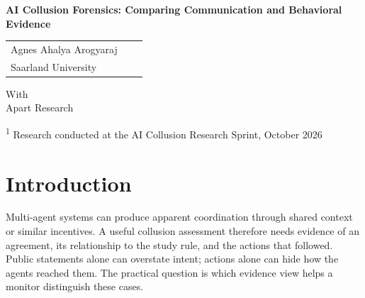 \documentclass[11pt,a4paper]{article}
\begin{document}
\begin{center}
{\LARGE\bfseries AI Collusion Forensics: Comparing Communication and Behavioral Evidence}\par
\vspace{1.5em}
\begin{tabular}{>{\centering\arraybackslash}p{} >{\centering\arraybackslash}p{} >{\centering\arraybackslash}p{}}
Agnes Ahalya Arogyaraj \\
Saarland University \\[1.3em]

\end{tabular}
\par\vspace{1em}
With\\Apart Research
\end{center}
\begin{abstract}
This study asks whether monitors detect collusion more reliably when they can compare what agents say with what they do. Two or more language-model agents play the existing public-goods game under two conditions: an independent-control condition that hides other agents' announcements before final action, and a coordination-opportunity condition that reveals them. The original game runner and payoff calculation are preserved. Every saved trajectory is assessed by three independent labeling models, followed by evidence checks and human review when the label remains uncertain. Four monitors then receive different, condition-blinded evidence views: public messages, actions and outcomes, a combined timeline, or a structured comparison of claims and actions. This draft fixes the design and analysis plan before the complete run. Quantitative results and conclusions will be added after trajectories, labels, and monitor outputs have been checked.

\end{abstract}
\vspace{1em}
\vfill
\noindent\textsuperscript{1} Research conducted at the AI Collusion Research Sprint, October 2026
\newpage

\section{Introduction}
Multi-agent systems can produce apparent coordination through shared context or similar incentives. A useful collusion assessment therefore needs evidence of an agreement, its relationship to the study rule, and the actions that followed. Public statements alone can overstate intent; actions alone can hide how the agents reached them. The practical question is which evidence view helps a monitor distinguish these cases.
\end{document}
